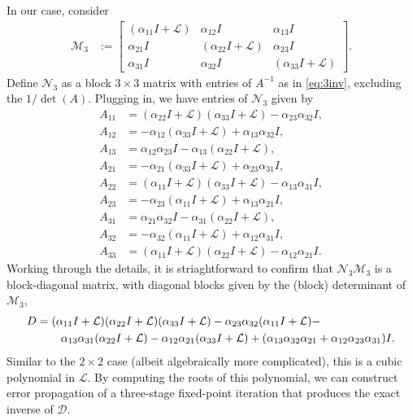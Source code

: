 \documentclass[a4paper,10pt]{article}
\begin{document}
In our case, consider 
%
\begin{align}\label{eq:Mnt}
\mathcal{M}_3 &:= \begin{bmatrix} (\alpha_{11} I + \mathcal{L}) & \alpha_{12}I & \alpha_{13}I \\
    \alpha_{21}I & (\alpha_{22}I + \mathcal{L}) & \alpha_{23} I \\
    \alpha_{31}I & \alpha_{32}I & (\alpha_{33} I + \mathcal{L}) \end{bmatrix}.
\end{align}
%
Define $\mathcal{N}_3$ as a block $3\times 3$ matrix with entries of $A^{-1}$ as in \eqref{eq:3inv},
excluding the $1/\det(A)$. Plugging in, we have entries of $\mathcal{N}_3$ given by
%
\begin{align*}
A_{11} &=  (\alpha_{22}I + \mathcal{L})(\alpha_{33} I + \mathcal{L}) - \alpha_{23}\alpha_{32}I, \\
    A_{12} &= -\alpha_{12}(\alpha_{33} I + \mathcal{L}) + \alpha_{13}\alpha_{32}I, \\
    A_{13} &=  \alpha_{12}\alpha_{23} I - \alpha_{13}(\alpha_{22}I + \mathcal{L}), \\
A_{21} &= -\alpha_{21}(\alpha_{33} I + \mathcal{L}) + \alpha_{23} \alpha_{31}I, \\
    A_{22} &=  (\alpha_{11} I + \mathcal{L})(\alpha_{33} I + \mathcal{L}) - \alpha_{13}\alpha_{31}I, \\
    A_{23} &= -\alpha_{23}(\alpha_{11} I + \mathcal{L}) + \alpha_{13}\alpha_{21}I, \\
A_{31} &=  \alpha_{21}\alpha_{32}I - \alpha_{31}(\alpha_{22}I + \mathcal{L}), \\
    A_{32} &= -\alpha_{32}(\alpha_{11} I + \mathcal{L}) + \alpha_{12}\alpha_{31}I, \\
    A_{33} &=  (\alpha_{11} I + \mathcal{L})(\alpha_{22}I + \mathcal{L}) - \alpha_{12}\alpha_{21}I.
\end{align*}
%
Working through the details, it is striaghtforward to confirm that $\mathcal{N}_3\mathcal{M}_3$
is a block-diagonal matrix, with diagonal blocks given by the (block) determinant of $\mathcal{M}_3$,
%
\begin{align*}
D & = (\alpha_{11}I + \mathcal{L}) (\alpha_{22}I + \mathcal{L})(\alpha_{33} I + \mathcal{L}) -
	\alpha_{23}\alpha_{32}(\alpha_{11}I + \mathcal{L}) - \\
& \hspace{5ex} 
	\alpha_{13}\alpha_{31}(\alpha_{22}I + \mathcal{L}) -
	\alpha_{12}\alpha_{21}(\alpha_{33}I + \mathcal{L}) + (\alpha_{13}\alpha_{32}\alpha_{21} + \alpha_{12}\alpha_{23}\alpha_{31})I.
\end{align*}
%
Similar to the $2\times 2$ case (albeit algebraically more complicated), this is a cubic polynomial in
$\mathcal{L}$. By computing the roots of this polynomial, we can construct error propagation of a
three-stage fixed-point iteration that produces the exact inverse of $\mathcal{D}$. 
\end{document}
